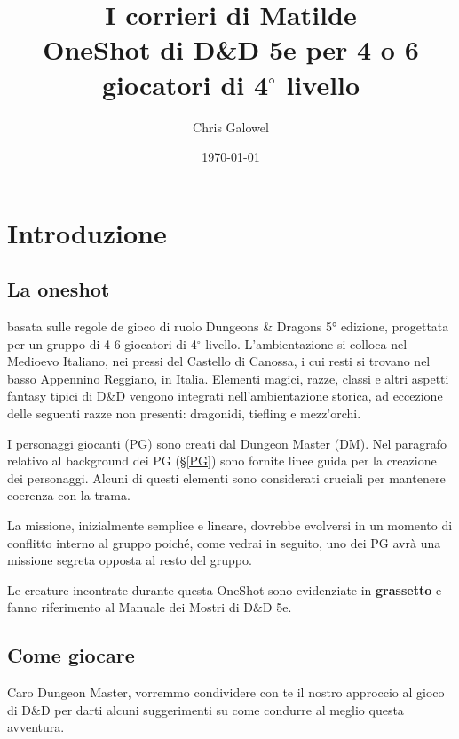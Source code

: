 \documentclass[letterpaper,twocolumn,openany,nodeprecatedcode]{dndbook}
\title{I corrieri di Matilde \\
\large OneShot di D\&D 5e per 4 o 6 giocatori di 4$^\circ$ livello}
\author{Chris Galowel}
\date{\today}
\begin{document}
\frontmatter

\maketitle

\tableofcontents


\mainmatter%





\chapter{Introduzione}


\section{La oneshot}
 basata sulle regole de gioco di ruolo Dungeons \& Dragons 5° edizione\cite{dnd:giocatore}, progettata per un gruppo di 4-6 giocatori di 4$^\circ$ livello. L'ambientazione si colloca nel Medioevo Italiano, nei pressi del Castello di Canossa, i cui resti si trovano nel basso Appennino Reggiano, in Italia. Elementi magici, razze, classi e altri aspetti fantasy tipici di D\&D vengono integrati nell'ambientazione storica, ad eccezione delle seguenti razze non presenti: dragonidi, tiefling e mezz'orchi.

I personaggi giocanti (PG) sono creati dal Dungeon Master (DM). Nel paragrafo relativo al background dei PG (§\ref{PG}) sono fornite linee guida per la creazione dei personaggi. Alcuni di questi elementi sono considerati cruciali per mantenere coerenza con la trama.

La missione, inizialmente semplice e lineare, dovrebbe evolversi in un momento di conflitto interno al gruppo poiché, come vedrai in seguito, uno dei PG avrà una missione segreta opposta al resto del gruppo.

Le creature incontrate durante questa OneShot sono evidenziate in \textbf{grassetto} e fanno riferimento al Manuale dei Mostri di D\&D 5e\cite{dnd:mostri}.

\section{Come giocare}
Caro Dungeon Master, vorremmo condividere con te il nostro approccio al gioco di D\&D per darti alcuni suggerimenti su come condurre al meglio questa avventura.
\end{document}
